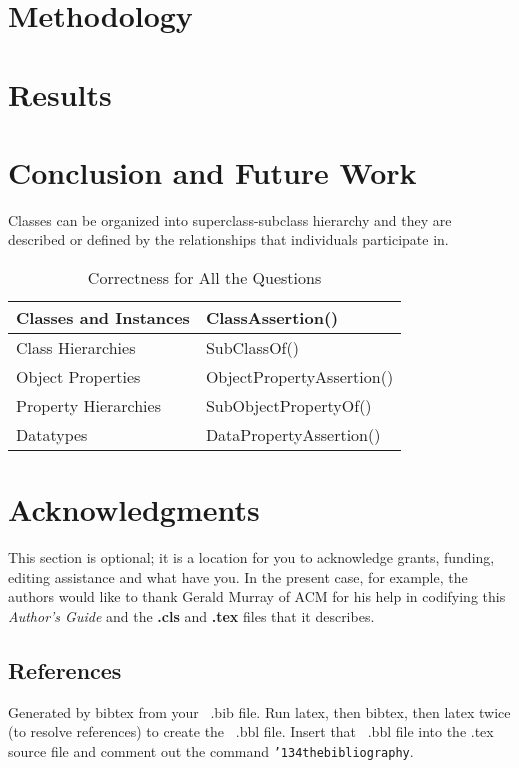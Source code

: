 \documentclass{sig-alternate}
\begin{document}
\section{Methodology}

\section{Results}

\section{Conclusion and Future Work}




Classes can be organized into superclass-subclass hierarchy and they are described or defined by the relationships that individuals participate in.

\begin{table*}

\centering

\caption{Correctness for All the Questions}

\begin{tabular}{|l|l|} \hline


Classes and Instances&ClassAssertion()\\ \hline
Class Hierarchies&SubClassOf()\\ \hline
Object Properties&ObjectPropertyAssertion()\\ \hline
Property Hierarchies&SubObjectPropertyOf()\\ \hline
Datatypes&DataPropertyAssertion()\\ \hline
\end{tabular}
\label{table:accuracy}
\end{table*}

\section{Acknowledgments}
This section is optional; it is a location for you
to acknowledge grants, funding, editing assistance and
what have you.  In the present case, for example, the
authors would like to thank Gerald Murray of ACM for
his help in codifying this \textit{Author's Guide}
and the \textbf{.cls} and \textbf{.tex} files that it describes.



 
\subsection{References}
Generated by bibtex from your ~.bib file.  Run latex,
then bibtex, then latex twice (to resolve references)
to create the ~.bbl file.  Insert that ~.bbl file into
the .tex source file and comment out
the command \texttt{{\char'134}thebibliography}.
\end{document}
